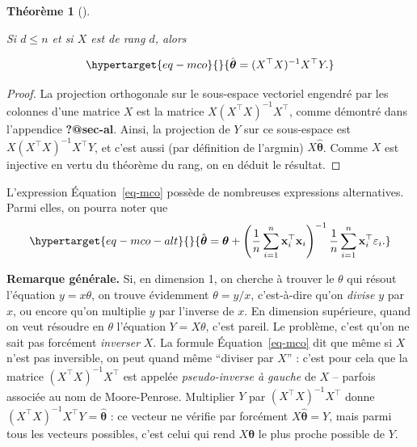 \documentclass[
  10,
  letterpaper,
  DIV=11,
  numbers=noendperiod]{scrreport}
\newcommand{\bx}{\mathbf{x}}
\newcommand{\bt}{\boldsymbol{\theta}}
\theoremstyle{plain}
\newtheorem{theorem}{Théorème}[chapter]
\theoremstyle{definition}
\theoremstyle{plain}
\theoremstyle{definition}
\theoremstyle{definition}
\theoremstyle{plain}
\theoremstyle{remark}
\begin{document}
\begin{theorem}[]\protect\hypertarget{thm-reg}{}\label{thm-reg}

Si \(d\leqslant n\) et si \(X\) est de rang \(d\), alors

\begin{equation}\protect\hypertarget{eq-mco}{}{\hat{\bt} = (X^\top X)^{-1}X^\top Y.}\label{eq-mco}\end{equation}

\end{theorem}

\begin{proof}

La projection orthogonale sur le sous-espace vectoriel engendré par les
colonnes d'une matrice \(X\) est la matrice \(X(X^\top X)^{-1}X^\top\),
comme démontré dans l'appendice \textbf{?@sec-al}. Ainsi, la projection
de \(Y\) sur ce sous-espace est \(X(X^\top X)^{-1}X^\top Y\), et c'est
aussi (par définition de l'argmin) \(X \hat{\bt}\). Comme \(X\) est
injective en vertu du théorème du rang, on en déduit le résultat.

\end{proof}

L'expression Équation~\ref{eq-mco} possède de nombreuses expressions
alternatives. Parmi elles, on pourra noter que
\begin{equation}\protect\hypertarget{eq-mco-alt}{}{\hat{\bt} = \bt + \left(\frac{1}{n}\sum_{i=1}^n \bx_i^\top\bx_i \right)^{-1}\frac{1}{n}\sum_{i=1}^n \bx_i^\top \varepsilon_i. }\label{eq-mco-alt}\end{equation}

\textbf{Remarque générale.} Si, en dimension 1, on cherche à trouver le
\(\theta\) qui résout l'équation \(y = x\theta\), on trouve évidemment
\(\theta = y/x\), c'est-à-dire qu'on \emph{divise} \(y\) par \(x\), ou
encore qu'on multiplie \(y\) par l'inverse de \(x\). En dimension
supérieure, quand on veut résoudre en \(\theta\) l'équation
\(Y = X\theta\), c'est pareil. Le problème, c'est qu'on ne sait pas
forcément \emph{inverser} \(X\). La formule Équation~\ref{eq-mco} dit
que même si \(X\) n'est pas inversible, on peut quand même ``diviser par
\(X\)'' : c'est pour cela que la matrice \((X^\top X)^{-1} X^\top\) est
appelée \emph{pseudo-inverse à gauche} de \(X\) -- parfois associée au
nom de Moore-Penrose. Multiplier \(Y\) par \((X^\top X)^{-1}X^\top\)
donne \((X^\top X)^{-1}X^\top Y = \hat{\bt}\) : ce vecteur ne vérifie
par forcément \(X{\hat{\bt}} = Y\), mais parmi tous les vecteurs
possibles, c'est celui qui rend \(X\bt\) le plus proche possible de
\(Y\).
\end{document}
